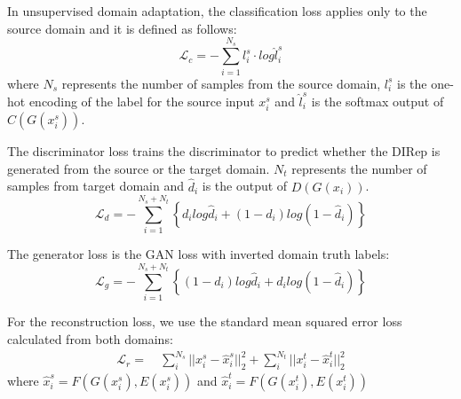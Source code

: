 \documentclass{article}
\begin{document}
In unsupervised domain adaptation, the classification loss applies only to the source domain and it is defined as follows:
\begin{equation}
\mathcal{L}_c= 
 -  \sum_{i=1}^{N_s} {l}_i^s \cdot log \hat{l}_i^s
\end{equation}%
where $N_s$ represents the number of samples from the source domain, $l_i^s$ is the one-hot encoding of the label for the source input $x_i^s$ and $\hat{l}_i^s$ is the softmax output of $C(G(x_i^s))$. 

The discriminator loss  trains the discriminator to predict whether the DIRep is generated from the source or the target domain. $N_t$ represents the number of samples from target domain and $\hat{d}_i$ is the output of $D(G(x_i))$.
\begin{equation}
\mathcal{L}_d= 
 -  \sum_{i=1}^{N_s + N_t} \left\{ {d}_ilog \hat{d}_i + (1-{d}_i)log (1-\hat{{d}}_i) \right\} 
\end{equation}%

The generator loss is the GAN loss with inverted domain truth labels:
\begin{equation}
\mathcal{L}_g= 
 -  \sum_{i=1}^{N_s + N_t} \left\{ (1-{d}_i)log \hat{d}_i + d_ilog (1-\hat{{d}}_i) \right\} 
\end{equation}%




For the reconstruction loss, we use the standard mean squared error loss calculated from both domains:
\begin{align}
    \mathcal{L}_r = &\ \sum_{i}^{N_s}||x_i^s - \hat{x}_i^s||_2^2 + \sum_{i}^{N_t}||x_i^t - \hat{x}_i^t||_2^2 
\end{align}%
where $\hat{x}_i^s = F(G(x_i^s), E(x_i^s))$ and $\hat{x}_i^t = F(G(x_i^t), E(x_i^t))$
\end{document}
